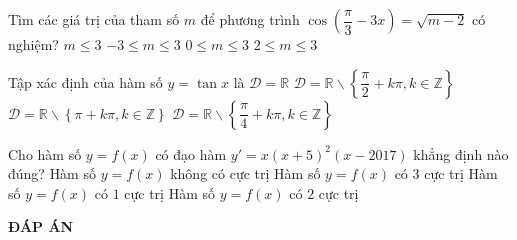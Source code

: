 \begin{ex}%
	Tìm các giá trị của tham số $m$ để phương trình $\cos \left(\dfrac{\pi}{3}-3x\right)=\sqrt{m-2}$ có nghiệm?
	\choice
	{$m\le 3$}
	{$-3\le m \le 3$}
	{$0\le m \le 3$}
	{\True $2 \le m \le 3$}
\end{ex} 
\begin{ex}%
	Tập xác định của hàm số $y=\tan x$ là
	\choice
	{$\mathscr{D}=\mathbb{R}$}
	{\True $\mathscr{D}=\mathbb{R}\backslash \left\{\dfrac{\pi}{2}+k\pi ,k\in \mathbb{Z}\right\}$ }
	{$\mathscr{D}=\mathbb{R}\backslash \left\{\pi+k\pi ,k\in \mathbb{Z}\right\}$}
	{$\mathscr{D}=\mathbb{R}\backslash \left\{\dfrac{\pi}{4}+k\pi ,k\in \mathbb{Z}\right\}$}
\end{ex} 
\begin{ex}%
	Cho hàm số $y=f\left(x\right)$ có đạo hàm $y'=x\left(x+5\right)^{2}\left(x-2017\right)$ khẳng định nào đúng?
	\choice
	{Hàm số $y=f\left(x\right)$ không có cực trị}
	{Hàm số $y=f\left(x\right)$ có $3$ cực trị}
	{Hàm số $y=f\left(x\right)$ có $1$ cực trị}
	{\True Hàm số $y=f\left(x\right)$ có $2$ cực trị}
\end{ex} 

\newpage
\begin{center}
	\textbf{ĐÁP ÁN}
\end{center}
\begin{multicols}{10}
	 
\end{multicols}
